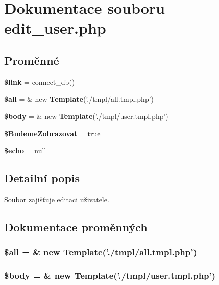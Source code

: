 \section{Dokumentace souboru edit\_\-user.php}
\label{edit__user_8php}
\subsection*{Proměnné}
\begin{CompactItemize}
\item 
{\bf \$link} = connect\_\-db()
\item 
{\bf \$all} = \& new {\bf Template}('./tmpl/all.tmpl.php')
\item 
{\bf \$body} = \& new {\bf Template}('./tmpl/user.tmpl.php')
\item 
{\bf \$BudemeZobrazovat} = true
\item 
{\bf \$echo} = null
\end{CompactItemize}


\subsection{Detailní popis}
Soubor zajišťuje editaci uživatele. 

\subsection{Dokumentace proměnných}
\subsubsection{\setlength{\rightskip}{0pt plus 5cm}\$all = \& new {\bf Template}('./tmpl/all.tmpl.php')}\label{edit__user_8php_3c74ea9d2348c9aba28d36e692bef2d2}


\subsubsection{\setlength{\rightskip}{0pt plus 5cm}\$body = \& new {\bf Template}('./tmpl/user.tmpl.php')}\label{edit__user_8php_26b9f9373f7bb79dfcf8a86dff086b45}


